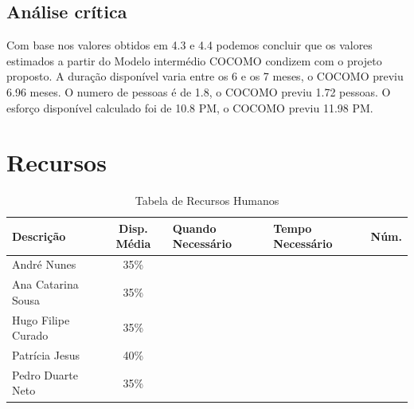 \documentclass[a4paper]{report}
\begin{document}
\subsection{Análise crítica}
\label{AC}
Com base nos valores obtidos em 4.3 e 4.4 podemos concluir que os valores estimados a partir do Modelo intermédio COCOMO condizem com o projeto proposto.
A duração disponível varia entre os 6 e os 7 meses, o COCOMO previu 6.96 meses.
O numero de pessoas é de 1.8, o COCOMO previu 1.72 pessoas.
O esforço disponível calculado foi de 10.8 PM, o COCOMO previu 11.98 PM.
\section{Recursos}
\begin{table}[h]
\centering
\begin{tabularx}{\textwidth}{X|c|X|X|c}
\textbf{Descrição} & \textbf{Disp. Média} & \textbf{Quando Necessário} & \textbf{Tempo Necessário} & \textbf{Núm.} \\ \hline
André Nunes & 35\% &  &  &  \\ \hline
Ana Catarina Sousa & 35\% &  &  &  \\ \hline
Hugo Filipe Curado & 35\% &  &  & \\ \hline
Patrícia Jesus & 40\% &  &  & \\ \hline
Pedro Duarte Neto & 35\% &  &  & \\
\end{tabularx}
\caption{Tabela de Recursos Humanos}
\label{TabRH}
\end{table}
\end{document}
